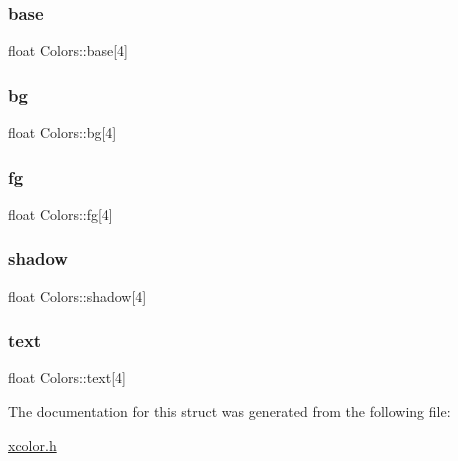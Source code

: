 \subsubsection{\texorpdfstring{base}{base}}
{\footnotesize\ttfamily float Colors\+::base\mbox{[}4\mbox{]}}

\mbox{\label{structColors_a38294c28d52e4a10abcaf322dff25a97}} 
\subsubsection{\texorpdfstring{bg}{bg}}
{\footnotesize\ttfamily float Colors\+::bg\mbox{[}4\mbox{]}}

\mbox{\label{structColors_afbcf70113bd28d362a23ac5fc6058924}} 
\subsubsection{\texorpdfstring{fg}{fg}}
{\footnotesize\ttfamily float Colors\+::fg\mbox{[}4\mbox{]}}

\mbox{\label{structColors_a6099f801db8569636b9bf29823c0e03b}} 
\subsubsection{\texorpdfstring{shadow}{shadow}}
{\footnotesize\ttfamily float Colors\+::shadow\mbox{[}4\mbox{]}}

\mbox{\label{structColors_aca2846df5e653cda1cb1ca97ea1b3e63}} 
\subsubsection{\texorpdfstring{text}{text}}
{\footnotesize\ttfamily float Colors\+::text\mbox{[}4\mbox{]}}



The documentation for this struct was generated from the following file\+:\begin{DoxyCompactItemize}
\item 
\hyperlink{xcolor_8h}{xcolor.\+h}\end{DoxyCompactItemize}

